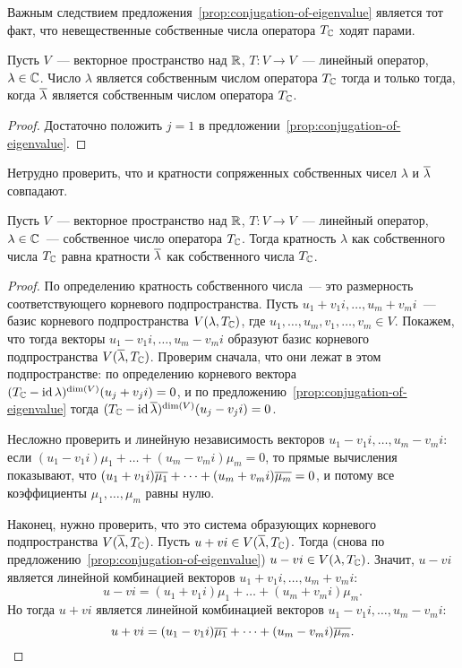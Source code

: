 Важным следствием предложения~\ref{prop:conjugation-of-eigenvalue} является
тот факт, что невещественные собственные числа оператора $T_\mathbb C$ ходят парами.
\begin{corollary}\label{cor:eigenvalues-come-in-pairs}
Пусть $V$~--- векторное пространство над $\mathbb R$, $T\colon V\to V$~--- линейный
оператор, $\lambda\in\mathbb C$. Число $\lambda$ является собственным числом
оператора $T_\mathbb C$ тогда и только тогда, когда $\overline\lambda$ является
собственным числом оператора $T_\mathbb C$.
\end{corollary}
\begin{proof}
Достаточно положить $j=1$ в предложении~\ref{prop:conjugation-of-eigenvalue}.
\end{proof}
Нетрудно проверить, что и кратности сопряженных собственных чисел
$\lambda$ и $\overline\lambda$ совпадают.
\begin{corollary}\label{cor:conjugate-eigenvalues-same-multiplicity}
Пусть $V$~--- векторное пространство над $\mathbb R$, $T\colon V\to V$~--- линейный
оператор, $\lambda\in\mathbb C$~--- собственное число оператора $T_\mathbb C$.
Тогда кратность $\lambda$ как собственного числа $T_\mathbb C$ равна
кратности $\overline\lambda$ как собственного числа $T_\mathbb C$.
\end{corollary}
\begin{proof}
По определению кратность собственного числа~--- это размерность
соответствующего корневого подпространства.
Пусть $u_1 + v_1i,\dots,u_m+v_mi$~--- базис корневого подпространства
$V(\lambda,T_\mathbb C)$, где $u_1,\dots,u_m,v_1,\dots,v_m\in V$. Покажем, что
тогда векторы $u_1 - v_1i,\dots,u_m - v_mi$ образуют базис
корневого подпространства $V(\overline\lambda,T_\mathbb C)$.
Проверим сначала, что они лежат в этом подпространстве:
по определению корневого вектора $(T_\mathbb C-\operatorname{id}\lambda)^{\dim(V)}(u_j+v_ji) = 0$,
и по предложению~\ref{prop:conjugation-of-eigenvalue}
тогда $(T_\mathbb C-\operatorname{id}\overline\lambda)^{\dim(V)}(u_j-v_ji) = 0$.

Несложно проверить и линейную независимость векторов
$u_1-v_1i,\dots,u_m-v_mi$: 
если $(u_1-v_1i)\mu_1 + \dots + (u_m-v_mi)\mu_m = 0$,
то прямые вычисления показывают, что
$(u_1+v_1i)\overline{\mu_1} + \dots + (u_m+v_mi)\overline{\mu_m} = 0$,
и потому все коэффициенты $\mu_1,\dots,\mu_m$ равны нулю.

Наконец, нужно проверить, что это система образующих корневого
подпространства $V(\overline\lambda,T_\mathbb C)$. Пусть $u+vi\in V(\overline\lambda,T_\mathbb C)$.
Тогда (снова по предложению~\ref{prop:conjugation-of-eigenvalue})
$u-vi\in V(\lambda,T_\mathbb C)$. Значит, $u-vi$ является линейной комбинацией
векторов $u_1+v_1i,\dots,u_m+v_mi$:
$$
u-vi = (u_1+v_1i)\mu_1 + \dots + (u_m+v_mi)\mu_m.
$$
Но тогда $u+vi$ является линейной комбинацией
векторов $u_1-v_1i,\dots,u_m-v_mi$:
$$
u+vi = (u_1-v_1i)\overline{\mu_1} + \dots + (u_m-v_mi)\overline{\mu_m}.
$$
\end{proof}

